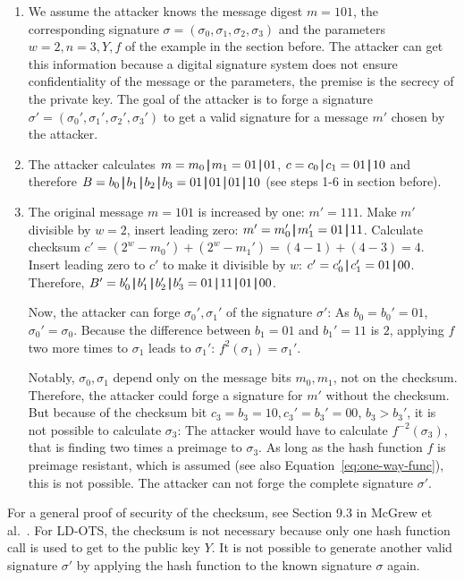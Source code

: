 \begin{enumerate}
\item We assume the attacker knows the message digest $m = 101$, the corresponding signature $\sigma = (\sigma_0, \sigma_1, \sigma_2, \sigma_3)$ and the parameters $w=2, n=3, Y, f$ of the example in the section before. The attacker can get this information because a digital signature system does not ensure confidentiality of the message or the parameters, the premise is the secrecy of the private key. The goal of the attacker is to forge a signature $\sigma' = (\sigma_0', \sigma_1', \sigma_2', \sigma_3')$ to get a valid signature for a message $m'$ chosen by the attacker. 

\item The attacker calculates $m  = m_0 \operatorname{|\!\!|} m_1 = 01 \operatorname{|\!\!|} 01$, $c = c_0 \operatorname{|\!\!|} c_1 = 01 \operatorname{|\!\!|} 10$ and therefore $B =  b_0 \concat b_1 \concat b_2 \concat b_3 = 01 \concat 01 \concat 01 \concat 10$ (see steps 1-6 in section before).

\item The original message $m = 101$ is increased by one: $m' = 111$. Make $m'$ divisible by $w = 2$, insert leading zero: $m' = m_0'\operatorname{|\!\!|} m_1' = 01 \operatorname{|\!\!|} 11$. Calculate checksum $c' = (2^w - m_0') + (2^w - m_1') = (4-1)+(4-3)=4$.
Insert leading zero to $c'$ to make it divisible by $w$: $c' = c_0' \operatorname{|\!\!|} c_1' = 01 \operatorname{|\!\!|} 00$. Therefore, $B' = b_0' \concat b_1' \concat b_2' \concat b_3' = 01 \concat 11 \concat 01 \concat 00$.

Now, the attacker can forge $\sigma_0', \sigma_1'$ of the signature $\sigma'$:
As $b_0 = b_0' = 01$, $\sigma_0' = \sigma_0$.
Because the difference between $b_1 = 01$ and $b_1' = 11$ is $2$, applying $f$ two more times to $\sigma_1$ leads to $\sigma_1'$: $f^2(\sigma_1) = \sigma_1'$.

Notably, $\sigma_0, \sigma_1$ depend only on the message bits $m_0, m_1$, not on the checksum. Therefore, the attacker could forge a signature for $m'$ without the checksum. But because of the checksum bit $c_3 = b_3 = 10, c_3' = b_3' = 00$, $b_3 > b_3'$, it is not possible to calculate $\sigma_3$: The attacker would have to calculate $f^{-2}(\sigma_3)$, that is finding two times a preimage to $\sigma_3$. As long as the hash function $f$ is preimage resistant, which is assumed (see also Equation~\ref{eq:one-way-func}), this is not possible. The attacker can not forge the complete signature $\sigma'$.

\end{enumerate}
For a general proof of security of the checksum, see Section 9.3 in McGrew et al.~\cite{LMS_RFC8554}.
For LD-OTS, the checksum is not necessary because only one hash function call is used to get to the public key $Y$. It is not possible to generate another valid signature $\sigma'$ by applying the hash function to the known signature $\sigma$ again.

